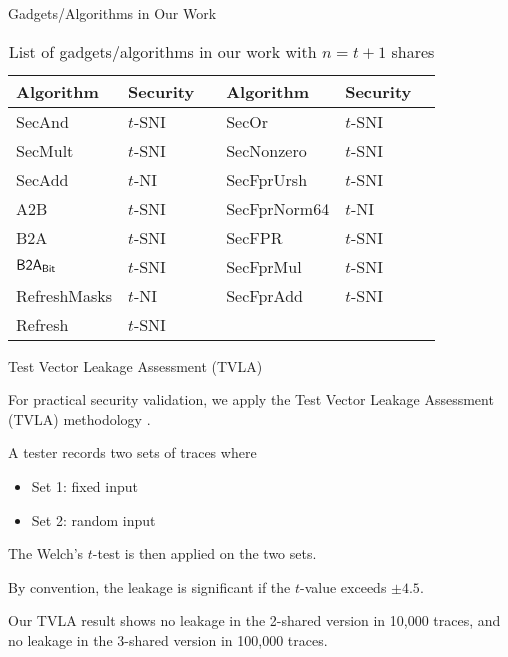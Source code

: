 \begin{frame}{Gadgets/Algorithms in Our Work}

\begin{table}
\centering
\begin{tabular}{l l | l l} 
\toprule
\textbf{Algorithm} & \textbf{Security$\quad$} & \textbf{Algorithm} & \textbf{Security$\quad$} \\
\midrule
{\sf SecAnd} & $t$-SNI & {\sf SecOr} & $t$-SNI \\
{\sf SecMult} & $t$-SNI & {\sf SecNonzero} & $t$-SNI \\
{\sf SecAdd} & $t$-NI & {\sf SecFprUrsh} & $t$-SNI \\
{\sf A2B} & $t$-SNI & {\sf SecFprNorm64} & $t$-NI\\
{\sf B2A} & $t$-SNI & {\sf SecFPR} & $t$-SNI \\
${\sf B2A_{Bit}}$ & $t$-SNI & {\sf SecFprMul} & $t$-SNI\\
{\sf RefreshMasks} & $t$-NI & {\sf SecFprAdd} & $t$-SNI\\
{\sf Refresh} & $t$-SNI \\
\bottomrule
\end{tabular}
\caption{List of gadgets/algorithms in our work with $n=t+1$ shares}
\label{table:gadgets_secureity}
\end{table}
\end{frame}

\begin{frame}{Test Vector Leakage Assessment (TVLA)}

For practical security validation, we apply the Test Vector Leakage Assessment (TVLA) methodology \cite{gilbert2011testing}.
\pause

A tester records two sets of traces where
\pause

\begin{itemize}
	\item Set 1: fixed input
	\pause
	\item Set 2: random input
\end{itemize}
\pause

The Welch's $t$-test is then applied on the two sets.
\pause

By convention, the leakage is significant if the $t$-value exceeds $\pm 4.5$.
\pause

Our TVLA result shows no leakage in the 2-shared version in 10,000 traces, and no leakage in the 3-shared version in 100,000 traces.

\end{frame}
